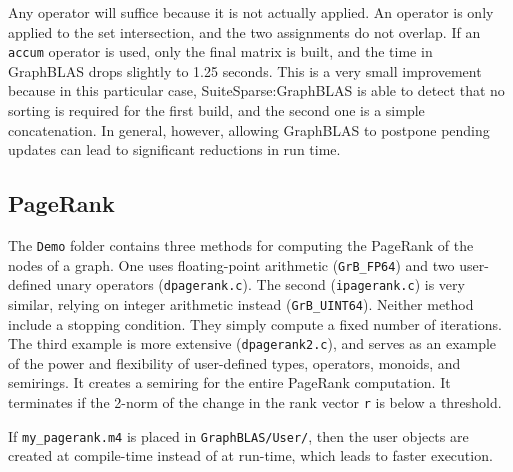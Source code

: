 \documentclass[12pt]{article}
\begin{document}
Any operator will suffice because it is not actually applied.  An operator is
only applied to the set intersection, and the two assignments do not overlap.
If an \verb'accum' operator is used, only the final matrix is built, and the
time in GraphBLAS drops slightly to 1.25 seconds.  This is a very small
improvement because in this particular case, SuiteSparse:GraphBLAS is able to
detect that no sorting is required for the first build, and the second one is a
simple concatenation.  In general, however, allowing GraphBLAS to postpone
pending updates can lead to significant reductions in run time.

\subsection{PageRank}
\label{pagerank}

The \verb'Demo' folder contains three methods for computing the PageRank of the
nodes of a graph.  One uses floating-point arithmetic (\verb'GrB_FP64') and two
user-defined unary operators (\verb'dpagerank.c').  The second
(\verb'ipagerank.c') is very similar, relying on integer arithmetic instead
(\verb'GrB_UINT64').  Neither method include a stopping condition.  They simply
compute a fixed number of iterations.  The third example is more extensive
(\verb'dpagerank2.c'), and serves as an example of the power and flexibility of
user-defined types, operators, monoids, and semirings.  It creates a semiring
for the entire PageRank computation.  It terminates if the 2-norm of the change
in the rank vector \verb'r' is below a threshold.


If \verb'my_pagerank.m4' is placed in \verb'GraphBLAS/User/', then
the user objects are created at compile-time instead of at run-time, which
leads to faster execution.

\newpage
\end{document}
